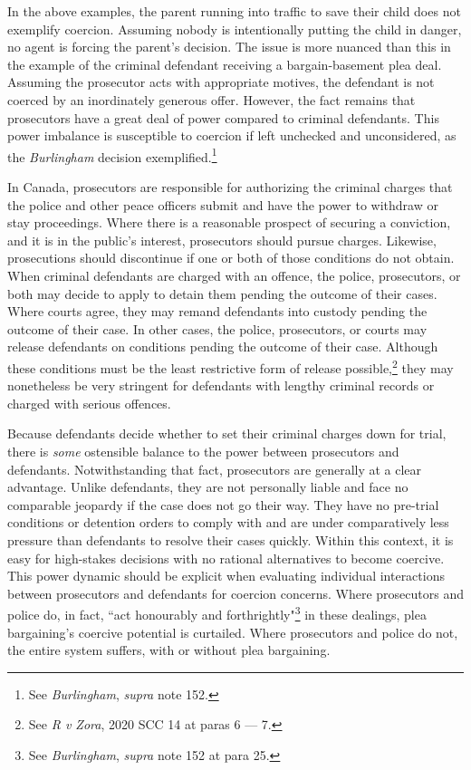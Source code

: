 In the above examples, the parent running into traffic to save their child does not exemplify coercion. Assuming nobody is intentionally putting the child in danger, no agent is forcing the parent's decision. The issue is more nuanced than this in the example of the criminal defendant receiving a bargain-basement plea deal. Assuming the prosecutor acts with appropriate motives, the defendant is not coerced by an inordinately generous offer. However, the fact remains that prosecutors have a great deal of power compared to criminal defendants. This power imbalance is susceptible to coercion if left unchecked and unconsidered, as the \textit{Burlingham} decision exemplified.\footnote{See \textit{Burlingham}, \textit{supra} note 152.}

In Canada, prosecutors are responsible for authorizing the criminal charges that the police and other peace officers submit and have the power to withdraw or stay proceedings. Where there is a reasonable prospect of securing a conviction, and it is in the public's interest, prosecutors should pursue charges. Likewise, prosecutions should discontinue if one or both of those conditions do not obtain. When criminal defendants are charged with an offence, the police, prosecutors, or both may decide to apply to detain them pending the outcome of their cases. Where courts agree, they may remand defendants into custody pending the outcome of their case. In other cases, the police, prosecutors, or courts may release defendants on conditions pending the outcome of their case. Although these conditions must be the least restrictive form of release possible,\footnote{See \textit{R v Zora}, 2020 SCC 14 at paras 6 — 7.} they may nonetheless be very stringent for defendants with lengthy criminal records or charged with serious offences.

Because defendants decide whether to set their criminal charges down for trial, there is \textit{some} ostensible balance to the power between prosecutors and defendants. Notwithstanding that fact, prosecutors are generally at a clear advantage. Unlike defendants, they are not personally liable and face no comparable jeopardy if the case does not go their way. They have no pre-trial conditions or detention orders to comply with and are under comparatively less pressure than defendants to resolve their cases quickly. Within this context, it is easy for high-stakes decisions with no rational alternatives to become coercive. This power dynamic should be explicit when evaluating individual interactions between prosecutors and defendants for coercion concerns. Where prosecutors and police do, in fact, ``act honourably and forthrightly"\footnote{See \textit{Burlingham}, \textit{supra} note 152 at para 25.} in these dealings, plea bargaining's coercive potential is curtailed. Where prosecutors and police do not, the entire system suffers, with or without plea bargaining.

